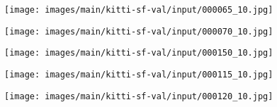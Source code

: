 \documentclass[10pt,twocolumn,letterpaper]{article}
\begin{document}
\begin{figure*}
    \captionsetup[subfigure]{labelformat=empty}

    \begin{subfigure}[b]{0.02\linewidth}
        \centering
    \end{subfigure}\hfill
    \begin{subfigure}[b]{0.19\linewidth}
        \texttt{[image: images/main/kitti-sf-val/input/000065\_10.jpg]}
    \end{subfigure}\hfill
    \begin{subfigure}[b]{0.19\linewidth}
        \texttt{[image: images/main/kitti-sf-val/input/000070\_10.jpg]}
    \end{subfigure}\hfill
    \begin{subfigure}[b]{0.19\linewidth}
        \texttt{[image: images/main/kitti-sf-val/input/000150\_10.jpg]}
    \end{subfigure}\hfill
    \begin{subfigure}[b]{0.19\linewidth}
        \texttt{[image: images/main/kitti-sf-val/input/000115\_10.jpg]}
    \end{subfigure}\hfill
    \begin{subfigure}[b]{0.19\linewidth}
        \texttt{[image: images/main/kitti-sf-val/input/000120\_10.jpg]}
    \end{subfigure}\hfill
    \begin{subfigure}[b]{0.02\linewidth}
        \hspace{10pt}
    \end{subfigure}\hfill


\end{figure*}
\end{document}
